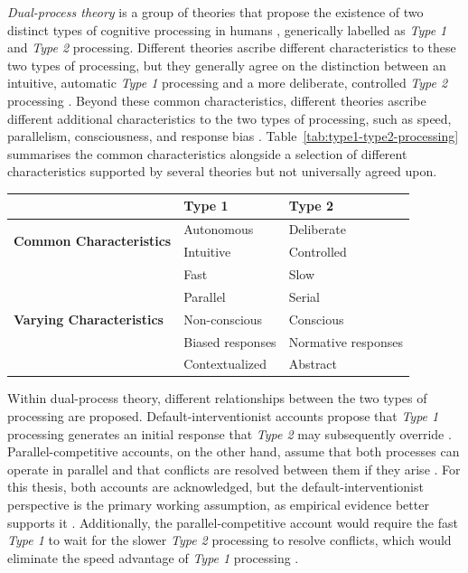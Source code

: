 \textit{Dual-process theory} is a group of theories that propose the existence of two distinct types of cognitive processing in humans \parencite{Evans2013}, generically labelled as \textit{Type 1} and \textit{Type 2} processing. Different theories ascribe different characteristics to these two types of processing, but they generally agree on the distinction between an intuitive, automatic \textit{Type 1} processing and a more deliberate, controlled \textit{Type 2} processing \parencite{Kahneman2011}. Beyond these common characteristics, different theories ascribe different additional characteristics to the two types of processing, such as speed, parallelism, consciousness, and response bias \parencite{Evans2013}. Table~\ref{tab:type1-type2-processing} summarises the common characteristics alongside a selection of different characteristics supported by several theories but not universally agreed upon.

\begin{ctable}
    \centering
    \begin{tabular}{l l l}
        \toprule
        & \textbf{Type 1} & \textbf{Type 2} \\
        \midrule
        \multirow{2}{*}{\textbf{Common Characteristics}} & Autonomous & Deliberate \\
        & Intuitive & Controlled \\
        \midrule
        \multirow{5}{*}{\textbf{Varying Characteristics}} & Fast & Slow \\
        & Parallel & Serial \\
        & Non-conscious & Conscious \\
        & Biased responses & Normative responses \\
        & Contextualized & Abstract \\
        \bottomrule
    \end{tabular}
    \caption[Comparison of Type 1 and Type 2 processing]{Comparison of Type 1 and Type 2 processing in dual-process theory. The table differentiates characteristics commonly agreed upon in literature and ones that only find support in some models. \textit{Adapted from \textcite{Evans2013}}.}
    \label{tab:type1-type2-processing}
\end{ctable}

Within dual-process theory, different relationships between the two types of processing are proposed. Default-interventionist accounts propose that \textit{Type 1} processing generates an initial response that \textit{Type 2} may subsequently override \parencite{Evans2013}. Parallel-competitive accounts, on the other hand, assume that both processes can operate in parallel and that conflicts are resolved between them if they arise \parencite{Evans2013}. For this thesis, both accounts are acknowledged, but the default-interventionist perspective is the primary working assumption, as empirical evidence better supports it \parencite{Evans2013, Kahneman2011}. Additionally, the parallel-competitive account would require the fast \textit{Type 1} to wait for the slower \textit{Type 2} processing to resolve conflicts, which would eliminate the speed advantage of \textit{Type 1} processing \parencite{Evans2013}.

